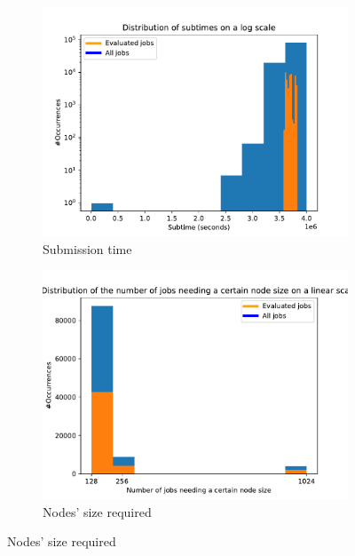 \documentclass[a4paper]{article}
\begin{document}
\begin{figure}[H]
\begin{subfigure}[b]{0.4\linewidth}\centering\includegraphics[width=1\linewidth]{MBSS/plot/Distribution/2022-01-17->2022-01-19_subtime.pdf}\caption{Submission time}\label{39}\end{subfigure}
\begin{subfigure}[b]{0.4\linewidth}\centering\includegraphics[width=1\linewidth]{MBSS/plot/Distribution/2022-01-17->2022-01-19_data_size.pdf}\caption{Nodes' size required}\label{40}\end{subfigure}

\end{figure}
\end{document}
